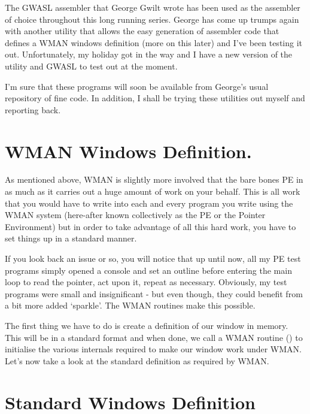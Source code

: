 The GWASL assembler that George Gwilt wrote has been used as the
    assembler of choice throughout this long running series. George has come up
    trumps again with another utility that allows the easy generation of
    assembler code that defines a WMAN windows definition (more on this later)
    and I've been testing it out. Unfortunately, my holiday got in the way and
    I have a new version of the utility and GWASL to test out at the
    moment.

I'm sure that these programs will soon be available from George's
    usual repository of fine code. In addition, I shall be trying these
    utilities out myself and reporting back.

\section{WMAN Windows Definition.}
\label{ch22-wdef-intro}%

As mentioned above, WMAN is slightly more involved that the bare
    bones PE in as much as it carries out a huge amount of work on your
    behalf. This is all work that you would have to write into each and every
    program you write using the WMAN system (here-{}after known collectively
    as the PE or the Pointer Environment) but in order to take advantage of
    all this hard work, you have to set things up in a standard manner.

If you look back an issue or so, you will notice that up until now,
    all my PE test programs simply opened a console and set an outline before
    entering the main loop to read the pointer, act upon it, repeat as
    necessary. Obviously, my test programs were small and insignificant -{} but
    even though, they could benefit from a bit more added `sparkle'. The WMAN
    routines make this possible.

The first thing we have to do is create a definition of our window
    in memory. This will be in a standard format and when done, we call a WMAN
    routine () to initialise the various internals required to make
    our window work under WMAN. Let's now take a look at the standard
    definition as required by WMAN.

\section{Standard Windows Definition}
\label{ch22-wdef}%

